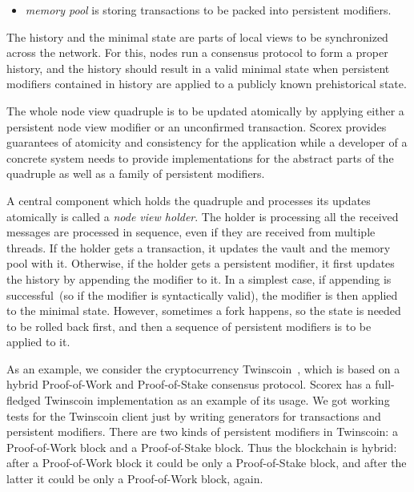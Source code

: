 \begin{itemize}
\item{\em memory pool} is storing transactions to be packed into persistent modifiers.
\end{itemize}

The history and the minimal state are parts of local views to be synchronized across the network. For this, nodes run a consensus protocol to form a proper history, and the history should result in a valid minimal state when persistent modifiers contained in history are applied to a publicly known prehistorical state.

The whole node view quadruple is to be updated atomically by applying either a persistent node view modifier or an unconfirmed transaction. Scorex provides guarantees of atomicity and consistency for the application while a developer of a concrete system needs to provide implementations for the abstract parts of the quadruple as well as a family of persistent modifiers.

A central component which holds the quadruple {\em <history, minimal state, vault, memory pool>} and processes its updates atomically is called a {\em node view holder}. The holder is processing all the received messages are processed in sequence, even if they are received from multiple threads. If the holder gets a transaction, it updates the vault and the memory pool with it. Otherwise, if the holder gets a persistent modifier, it first updates the history by appending the modifier to it. In a simplest case, if appending is successful~(so if the modifier is syntactically valid), the modifier is then applied to the minimal state. However, sometimes a fork happens, so the state is needed to be rolled back first, and then a sequence of persistent modifiers is to be applied to it. 

As an example, we consider the cryptocurrency Twinscoin~\cite{cryptoeprint:2017:232}, which is based on a hybrid Proof-of-Work and Proof-of-Stake consensus protocol. Scorex has a full-fledged Twinscoin implementation as an example of its usage. We got working tests for the Twinscoin client just by writing generators for transactions and persistent modifiers. There are two kinds of persistent modifiers in Twinscoin: a Proof-of-Work block and a Proof-of-Stake block. Thus the blockchain is hybrid: after a Proof-of-Work block it could be only a Proof-of-Stake block, and after the latter it could be only a Proof-of-Work block, again.   
